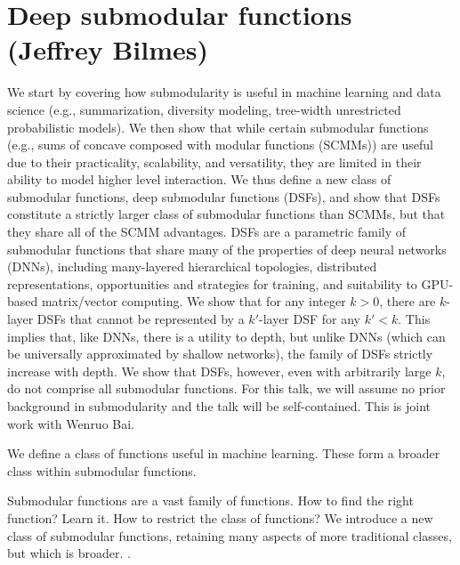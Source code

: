 \section{Deep submodular functions (Jeffrey Bilmes)}
We start by covering how submodularity is useful in machine learning
and data science (e.g., summarization, diversity modeling, tree-width
unrestricted probabilistic models). We then show that while certain
submodular functions (e.g., sums of concave composed with modular
functions (SCMMs)) are useful due to their practicality, scalability,
and versatility, they are limited in their ability to model higher
level interaction.  We thus define a new class of submodular
functions, deep submodular functions (DSFs), and show that DSFs
constitute a strictly larger class of submodular functions than SCMMs,
but that they share all of the SCMM advantages.  DSFs are a parametric
family of submodular functions that share many of the properties of
deep neural networks (DNNs), including many-layered hierarchical
topologies, distributed representations, opportunities and strategies
for training, and suitability to GPU-based matrix/vector computing.
We show that for any integer $k>0$, there are $k$-layer DSFs that
cannot be represented by a $k'$-layer DSF for any $k'<k$. This implies
that, like DNNs, there is a utility to depth, but unlike DNNs (which
can be universally approximated by shallow networks), the family of
DSFs strictly increase with depth.  We show that DSFs, however, even
with arbitrarily large $k$, do not comprise all submodular functions.
For this talk, we will assume no prior background in submodularity and
the talk will be self-contained.  This is joint work with Wenruo Bai.

We define a class of functions useful in machine learning. These form a broader class within submodular functions.

Submodular functions are a vast family of functions. 
How to find the right function? Learn it. How to restrict the class of functions? 
We introduce a new class of submodular functions, retaining many aspects of more traditional classes, but which is broader.
.

